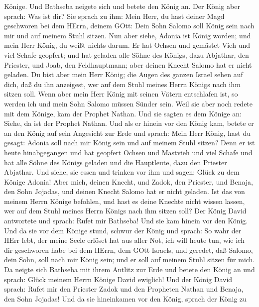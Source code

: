 Könige.  Und Bathseba neigete sich und betete den König an.
Der König aber sprach: Was ist dir?  Sie sprach zu ihm:
Mein Herr, du hast deiner Magd geschworen bei dem HErrn, deinem GOtt:
Dein Sohn Salomo soll König sein nach mir und auf meinem Stuhl sitzen.
 Nun aber siehe, Adonia ist König worden; und mein Herr
König, du weißt nichts darum.  Er hat Ochsen und gemästet
Vieh und viel Schafe geopfert; und hat geladen alle Söhne des Königs,
dazu Abjathar, den Priester, und Joab, den Feldhauptmann; aber deinen
Knecht Salomo hat er nicht geladen.  Du bist aber mein Herr
König; die Augen des ganzen Israel sehen auf dich, daß du ihn anzeigest,
wer auf dem Stuhl meines Herrn Königs nach ihm sitzen soll.
 Wenn aber mein Herr König mit seinen Vätern entschlafen
ist, so werden ich und mein Sohn Salomo müssen Sünder sein.
 Weil sie aber noch redete mit dem Könige, kam der Prophet
Nathan.  Und sie sagten es dem Könige an: Siehe, da ist der
Prophet Nathan. Und als er hinein vor den König kam, betete er an den
König auf sein Angesicht zur Erde  und sprach: Mein Herr
König, hast du gesagt: Adonia soll nach mir König sein und auf meinem
Stuhl sitzen?  Denn er ist heute hinabgegangen und hat
geopfert Ochsen und Mastvieh und viel Schafe und hat alle Söhne des
Königs geladen und die Hauptleute, dazu den Priester Abjathar. Und
siehe, sie essen und trinken vor ihm und sagen: Glück zu dem Könige
Adonia!  Aber mich, deinen Knecht, und Zadok, den Priester,
und Benaja, den Sohn Jojadas, und deinen Knecht Salomo hat er nicht
geladen.  Ist das von meinem Herrn Könige befohlen, und
hast es deine Knechte nicht wissen lassen, wer auf dem Stuhl meines
Herrn Königs nach ihm sitzen soll?  Der König David
antwortete und sprach: Rufet mir Bathseba! Und sie kam hinein vor den
König. Und da sie vor dem Könige stund,  schwur der König
und sprach: So wahr der HErr lebt, der meine Seele erlöset hat aus aller
Not,  ich will heute tun, wie ich dir geschworen habe bei
dem HErrn, dem GOtt Israels, und geredet, daß Salomo, dein Sohn, soll
nach mir König sein; und er soll auf meinem Stuhl sitzen für mich.
 Da neigte sich Bathseba mit ihrem Antlitz zur Erde und
betete den König an und sprach: Glück meinem Herrn Könige David
ewiglich!  Und der König David sprach: Rufet mir den
Priester Zadok und den Propheten Nathan und Benaja, den Sohn Jojadas!
Und da sie hineinkamen vor den König,  sprach der König zu
